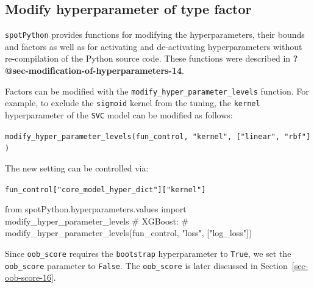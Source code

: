 \documentclass[
  letterpaper,
  DIV=11,
  numbers=noendperiod]{scrreprt}
\newenvironment{Shaded}{\begin{snugshade}}{\end{snugshade}}
\newcommand{\CommentTok}[1]{\textcolor[rgb]{0.37,0.37,0.37}{#1}}
\newcommand{\ImportTok}[1]{\textcolor[rgb]{0.00,0.46,0.62}{#1}}
\newcommand{\NormalTok}[1]{\textcolor[rgb]{0.00,0.23,0.31}{#1}}
\begin{document}
\hypertarget{modify-hyperparameter-of-type-factor-1}{%
\subsection{Modify hyperparameter of type
factor}\label{modify-hyperparameter-of-type-factor-1}}

\texttt{spotPython} provides functions for modifying the
hyperparameters, their bounds and factors as well as for activating and
de-activating hyperparameters without re-compilation of the Python
source code. These functions were described in
\textbf{?@sec-modification-of-hyperparameters-14}.

Factors can be modified with the
\texttt{modify\_hyper\_parameter\_levels} function. For example, to
exclude the \texttt{sigmoid} kernel from the tuning, the \texttt{kernel}
hyperparameter of the \texttt{SVC} model can be modified as follows:

\texttt{modify\_hyper\_parameter\_levels(fun\_control,\ "kernel",\ {[}"linear",\ "rbf"{]})}

The new setting can be controlled via:

\texttt{fun\_control{[}"core\_model\_hyper\_dict"{]}{[}"kernel"{]}}

\begin{Shaded}
\begin{Highlighting}[]
\ImportTok{from}\NormalTok{ spotPython.hyperparameters.values }\ImportTok{import}\NormalTok{ modify\_hyper\_parameter\_levels}
\CommentTok{\# XGBoost:}
\CommentTok{\# modify\_hyper\_parameter\_levels(fun\_control, "loss", ["log\_loss"])}
\end{Highlighting}
\end{Shaded}

\begin{tcolorbox}[enhanced jigsaw, left=2mm, toprule=.15mm, colframe=quarto-callout-note-color-frame, leftrule=.75mm, title=\textcolor{quarto-callout-note-color}{\faInfo}\hspace{0.5em}{Note: RandomForestClassifier and Out-of-bag Estimation}, toptitle=1mm, opacitybacktitle=0.6, arc=.35mm, titlerule=0mm, opacityback=0, bottomtitle=1mm, coltitle=black, rightrule=.15mm, colback=white, colbacktitle=quarto-callout-note-color!10!white, breakable, bottomrule=.15mm]

Since \texttt{oob\_score} requires the \texttt{bootstrap} hyperparameter
to \texttt{True}, we set the \texttt{oob\_score} parameter to
\texttt{False}. The \texttt{oob\_score} is later discussed in
Section~\ref{sec-oob-score-16}.

\end{tcolorbox}
\end{document}
